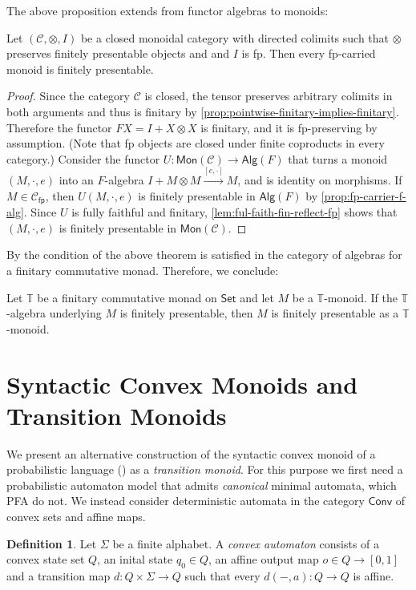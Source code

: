 \documentclass[a4paper, UKenglish, numberwithinsect, thm-restate, cleveref, final]{lipics-v2021}
\theoremstyle{plain}
\theoremstyle{definition}
\newtheorem{defn}[theorem]{Definition} \newtheorem{expl}[theorem]{Example} \newtheorem{rem}[theorem]{Remark} \newtheorem{notn}[theorem]{Notation} \newtheorem{assumption}[theorem]{Assumption}
\newcommand{\C}{\ensuremath{\mathcal{C}}}
\newcommand{\T}{\ensuremath{\mathbb{T}}\xspace}
\newcommand{\Alg}{\ensuremath{\mathsf{Alg}}}
\newcommand{\Set}{\ensuremath{\mathsf{Set}}\xspace}
\newcommand{\xto}{\xrightarrow}
\newcommand{\mult}{\mathbin{\boldsymbol{\cdot}}}
\newcommand{\fp}{\mathsf{fp}}
\newcommand{\Cfp}{\C_\fp}
\newcommand{\Conv}{\ensuremath{\mathsf{Conv}}\xspace}
\newcommand{\conv}{\Conv}
\newcommand{\Mon}{\mathsf{Mon}}
\numberwithin{equation}{section}
\begin{document}
The above proposition extends from functor algebras to monoids:

\begin{theorem}\label{thm:mon-fp}
  Let \((\C,\otimes,I)\) be a closed monoidal category with directed colimits such that $\otimes$ preserves finitely presentable objects and  and $I$ is fp.
  Then every fp-carried monoid is finitely presentable.
\end{theorem}
\begin{proof}
  Since the category \(\C\) is closed, the tensor preserves arbitrary colimits in both arguments and thus is finitary by \autoref{prop:pointwise-finitary-implies-finitary}.
  Therefore the functor \(FX = I + X\otimes X\) is finitary, and it is fp-preserving by assumption. (Note that fp objects are closed under finite coproducts in every category.)
  Consider the functor \(U \colon \Mon(\C) \rightarrow \Alg(F)\) that turns a monoid $(M,\mult,e)$ into an $F$-algebra $I+M\otimes M\xto{[e,\mult]} M$, and is identity on morphisms. If $M\in \Cfp$, then
   $U(M,\mult,e)$ is finitely presentable in \(\Alg(F)\) by \autoref{prop:fp-carrier-f-alg}.
  Since \(U\) is fully faithful and finitary, \autoref{lem:ful-faith-fin-reflect-fp} shows that \((M,\mult,e)\) is finitely presentable in \(\Mon(\C)\).
\end{proof}
By  the condition of the above theorem is satisfied in the category of algebras for a finitary commutative monad. Therefore, we conclude:

\begin{corollary}\label{cor:fb-impl-fp}
  Let \(\T\) be a finitary commutative monad on \Set and let $M$ be a $\T$-monoid. If the $\T$-algebra underlying $M$ is finitely presentable, then $M$ is finitely presentable as a $\T$-monoid.
\end{corollary}

\section{Syntactic Convex Monoids and Transition Monoids}\label{app:trans-mon}
We present an alternative construction of the syntactic convex monoid of a probabilistic language () as a \emph{transition monoid}. For this purpose we first need a probabilistic automaton model that admits \emph{canonical} minimal automata, which PFA do not. We instead consider deterministic automata in the category $\conv$ of  convex sets and affine maps.

\begin{defn}
  Let \(\Sigma\) be a finite alphabet.
  A \emph{convex automaton} consists of a convex state set \(Q\), an inital state \(q_{0} \in Q\), an affine output map \(o \in Q\to [0,1]\) and a transition map \(d \colon Q \times \Sigma \rightarrow Q\) such that every \(d(-, a) \colon Q \rightarrow Q\) is affine.
\end{defn}
\end{document}
